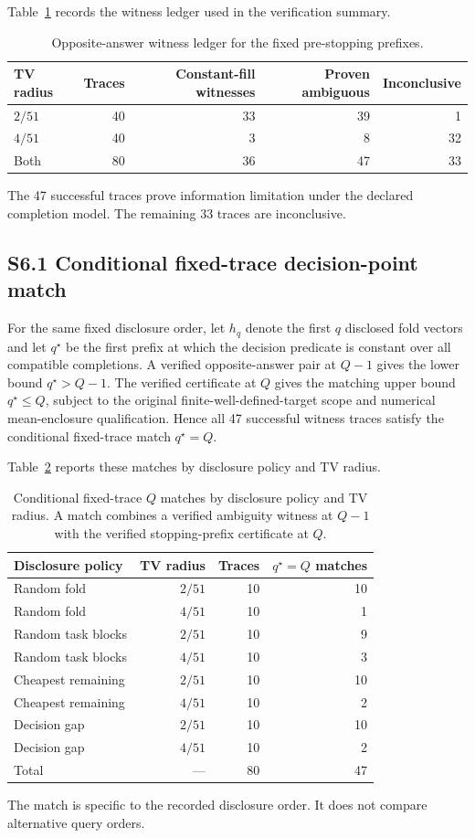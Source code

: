 \documentclass[11pt]{article}
\begin{document}
Table~\ref{tab:s1_witnesses} records the witness ledger used in the verification summary.
\begin{table}[H]
\centering
\caption{Opposite-answer witness ledger for the fixed pre-stopping prefixes.}
\label{tab:s1_witnesses}
\begin{tabular}{lrrrr}
\toprule
TV radius & Traces & Constant-fill witnesses & Proven ambiguous & Inconclusive\\
\midrule
$2/51$ & 40 & 33 & 39 & 1\\
$4/51$ & 40 & 3 & 8 & 32\\
Both & 80 & 36 & 47 & 33\\
\bottomrule
\end{tabular}
\end{table}
The 47 successful traces prove information limitation under the declared completion model. The remaining 33 traces are inconclusive.

\subsection*{S6.1 Conditional fixed-trace decision-point match}
For the same fixed disclosure order, let $h_q$ denote the first $q$ disclosed fold vectors and let $q^\star$ be the first prefix at which the decision predicate is constant over all compatible completions. A verified opposite-answer pair at $Q-1$ gives the lower bound $q^\star>Q-1$. The verified certificate at $Q$ gives the matching upper bound $q^\star\le Q$, subject to the original finite-well-defined-target scope and numerical mean-enclosure qualification. Hence all 47 successful witness traces satisfy the conditional fixed-trace match $q^\star=Q$.

Table~\ref{tab:s2_qmatch} reports these matches by disclosure policy and TV radius.
\begin{table}[H]
\centering
\caption{Conditional fixed-trace $Q$ matches by disclosure policy and TV radius. A match combines a verified ambiguity witness at $Q-1$ with the verified stopping-prefix certificate at $Q$.}
\label{tab:s2_qmatch}
\begin{tabular}{lrrr}
\toprule
Disclosure policy & TV radius & Traces & $q^\star=Q$ matches\\
\midrule
Random fold & $2/51$ & 10 & 10\\
Random fold & $4/51$ & 10 & 1\\
Random task blocks & $2/51$ & 10 & 9\\
Random task blocks & $4/51$ & 10 & 3\\
Cheapest remaining & $2/51$ & 10 & 10\\
Cheapest remaining & $4/51$ & 10 & 2\\
Decision gap & $2/51$ & 10 & 10\\
Decision gap & $4/51$ & 10 & 2\\
\midrule
Total & --- & 80 & 47\\
\bottomrule
\end{tabular}
\end{table}
The match is specific to the recorded disclosure order. It does not compare alternative query orders.
\end{document}
